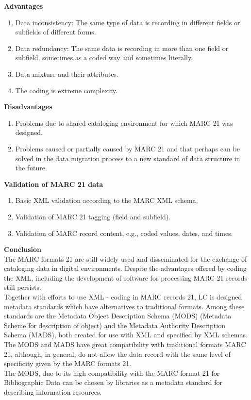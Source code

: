 \begin{enumerate}
	{\bf Advantages}
	\begin{enumerate}
		\item Data inconsistency: The same type of data is recording in different fields or subfields of different forms.
		\item Data redundancy: The same data is recording in more than one field or subfield, sometimes as a coded way and sometimes literally.	
		\item Data mixture and their attributes.
		\item The coding is extreme complexity.
	\end{enumerate}	
	{\bf Disadvantages}
	\begin{enumerate}
		\item Problems due to shared cataloging environment for which MARC 21 was designed.
		\item Problems caused or partially caused by MARC 21 and that perhaps can be solved in the data migration process to a new standard of data structure in the future.
	\end{enumerate}
	
	{\bf Validation of MARC 21 data}
	\begin{enumerate}
		\item Basic XML validation according to the MARC XML schema.
		\item Validation of MARC 21 tagging (field and subfield).
		\item Validation of MARC record content, e.g., coded values, dates, and times.
	\end{enumerate}
	
	{\bf Conclusion}\\
	The MARC formats 21 are still widely used and disseminated for the exchange of cataloging data in digital environments. 
	Despite the advantages offered by coding the XML, including the development of software for processing MARC 21 records still persists.\\
	Together with efforts to use XML - coding in MARC records 21, LC is designed metadata standards which have alternatives to traditional formats. 
	Among these standards are the Metadata Object Description Schema (MODS) (Metadata Scheme for description of object) and the Metadata Authority Description Schema (MADS), both created for use with XML and specified by XML schemas.\\
	The MODS and MADS have great compatibility with traditional formats MARC 21, although, in general, do not allow the data record with the same level of specificity given by the MARC formats 21.\\
	The MODS, due to its high compatibility with the MARC format 21 for Bibliographic Data can be chosen by libraries as a metadata standard for describing information resources.


\end{enumerate}
